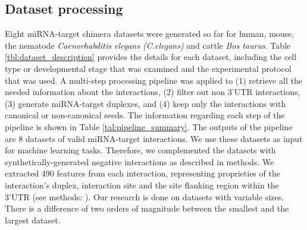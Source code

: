 \documentclass{bmcart}
\begin{document}
\subsection*{Dataset processing}
Eight miRNA-target chimera datasets were generated so far for human, mouse, the nematode \textit{Caenorhabditis elegans (C.elegans)} and cattle \textit{Bos taurus}. Table \ref{tbl:dataset_description} provides the details for each dataset, including the cell type or developmental stage that was examined and the experimental protocol that was used. A multi-step processing pipeline was applied to (1) retrieve all the needed information about the interactions, (2) filter out non 3'UTR interactions, (3) generate miRNA-target duplexes, and (4) keep only the interactions with canonical or non-canonical seeds. The information regarding each step of the pipeline is shown in Table \ref{tal:pipeline_summary}. The outputs of the pipeline are 8 datasets of valid miRNA-target interactions. We use these datasets as input for machine learning tasks. Therefore, we complemented the datasets with synthetically-generated negative interactions as described in methods. We extracted 490 features from each interaction, representing proprieties of the interaction's duplex, interaction site and the site flanking region within the 3'UTR (see methods: ).
Our research is done on datasets with variable sizes. There is a difference of two orders of magnitude between the smallest and the largest dataset.
\end{document}
